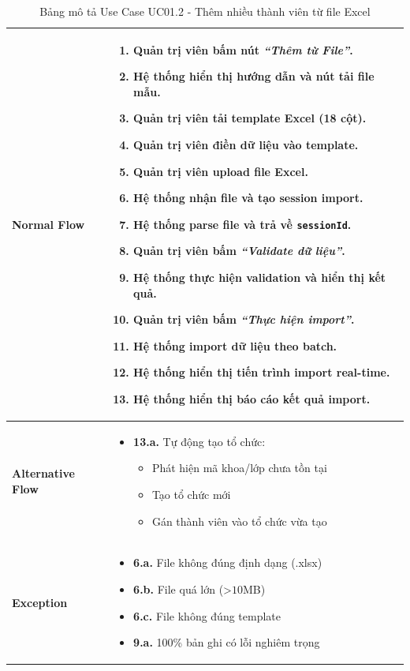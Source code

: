 \begin{table}[H]
\begin{tabular}{|m{}|m{}|}
\textbf{Normal Flow} 
&
\begin{enumerate}
    \item Quản trị viên bấm nút \textit{``Thêm từ File''}.
    \item Hệ thống hiển thị hướng dẫn và nút tải file mẫu.
    \item Quản trị viên tải template Excel (18 cột).
    \item Quản trị viên điền dữ liệu vào template.
    \item Quản trị viên upload file Excel.
    \item Hệ thống nhận file và tạo session import.
    \item Hệ thống parse file và trả về \texttt{sessionId}.
    \item Quản trị viên bấm \textit{``Validate dữ liệu''}.
    \item Hệ thống thực hiện validation và hiển thị kết quả.
    \item Quản trị viên bấm \textit{``Thực hiện import''}.
    \item Hệ thống import dữ liệu theo batch.
    \item Hệ thống hiển thị tiến trình import real-time.
    \item Hệ thống hiển thị báo cáo kết quả import.
\end{enumerate}
\\ 
\hline

\textbf{Alternative Flow} 
&
\begin{itemize}[label=--]
    \item \textbf{13.a.} Tự động tạo tổ chức:
    \begin{itemize}[label=+]
        \item Phát hiện mã khoa/lớp chưa tồn tại
        \item Tạo tổ chức mới
        \item Gán thành viên vào tổ chức vừa tạo
    \end{itemize}
\end{itemize}
\\ 
\hline

\textbf{Exception} 
&
\begin{itemize}[label=--]
    \item \textbf{6.a.} File không đúng định dạng (.xlsx)
    \item \textbf{6.b.} File quá lớn (>$10$MB)
    \item \textbf{6.c.} File không đúng template
    \item \textbf{9.a.} 100\% bản ghi có lỗi nghiêm trọng
\end{itemize}
\\ 
\hline

\end{tabular}
\caption{Bảng mô tả Use Case UC01.2 - Thêm nhiều thành viên từ file Excel}
\end{table}

